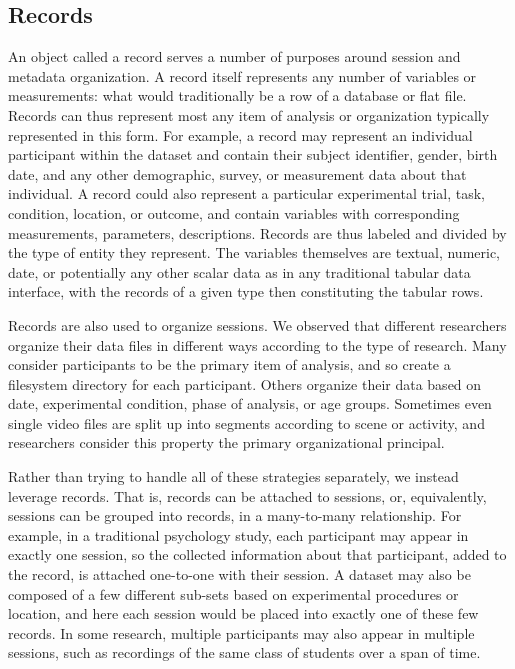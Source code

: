 \documentclass{sig-alternate}
\begin{document}
\subsection{Records}

An object called a record serves a number of purposes around session and metadata organization.
A record itself represents any number of variables or measurements: what would traditionally be a row of a database or flat file.
Records can thus represent most any item of analysis or organization typically represented in this form.
For example, a record may represent an individual participant within the dataset and contain their subject identifier, gender, birth date, and any other demographic, survey, or measurement data about that individual.
A record could also represent a particular experimental trial, task, condition, location, or outcome, and contain variables with corresponding measurements, parameters, descriptions.
Records are thus labeled and divided by the type of entity they represent.
The variables themselves are textual, numeric, date, or potentially any other scalar data as in any traditional tabular data interface, with the records of a given type then constituting the tabular rows.

Records are also used to organize sessions.
We observed that different researchers organize their data files in different ways according to the type of research.
Many consider participants to be the primary item of analysis, and so create a filesystem directory for each participant.
Others organize their data based on date, experimental condition, phase of analysis, or age groups.
Sometimes even single video files are split up into segments according to scene or activity, and researchers consider this property the primary organizational principal.

Rather than trying to handle all of these strategies separately, we instead leverage records.
That is, records can be attached to sessions, or, equivalently, sessions can be grouped into records, in a many-to-many relationship.
For example, in a traditional psychology study, each participant may appear in exactly one session, so the collected information about that participant, added to the record, is attached one-to-one with their session.
A dataset may also be composed of a few different sub-sets based on experimental procedures or location, and here each session would be placed into exactly one of these few records.
In some research, multiple participants may also appear in multiple sessions, such as recordings of the same class of students over a span of time.
\end{document}
